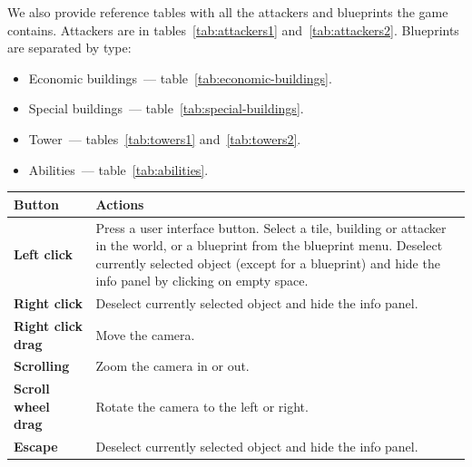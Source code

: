 We also provide reference tables with all the attackers and blueprints the game contains.
Attackers are in tables~\ref{tab:attackers1} and~\ref{tab:attackers2}.
Blueprints are separated by type:
\begin{itemize}
    \item Economic buildings~--- table~\ref{tab:economic-buildings}.
    \item Special buildings~--- table~\ref{tab:special-buildings}.
    \item Tower~--- tables~\ref{tab:towers1} and~\ref{tab:towers2}.
    \item Abilities~--- table~\ref{tab:abilities}.
\end{itemize}

\begin{table}[H]
    \centering
    \begin{tabular}{m{}m{}}
        \toprule
        \textbf{Button}                                   & \textbf{Actions}                                                     \\
        \midrule
        \textbf{Left click}                               & Press a user interface button. \vspace{4pt}\newline
        Select a tile, building or attacker in the world, or a blueprint from the blueprint menu. \vspace{4pt}\newline
        Deselect currently selected object (except for a blueprint) and hide the info panel by clicking on empty space.          \\\midrule
        \textbf{Right click}                              & Deselect currently selected object and hide the info panel.          \\\midrule
        \textbf{Right click \newline drag}                & Move the camera.                                                     \\\midrule
        \textbf{Scrolling}                                & Zoom the camera in or out.                                           \\\midrule
        \textbf{Scroll wheel \newline drag}               & Rotate the camera to the left or right.                              \\\midrule
        \textbf{Escape}                                   & Deselect currently selected object and hide the info panel.          \\\midrule

\end{tabular}
\end{table}
